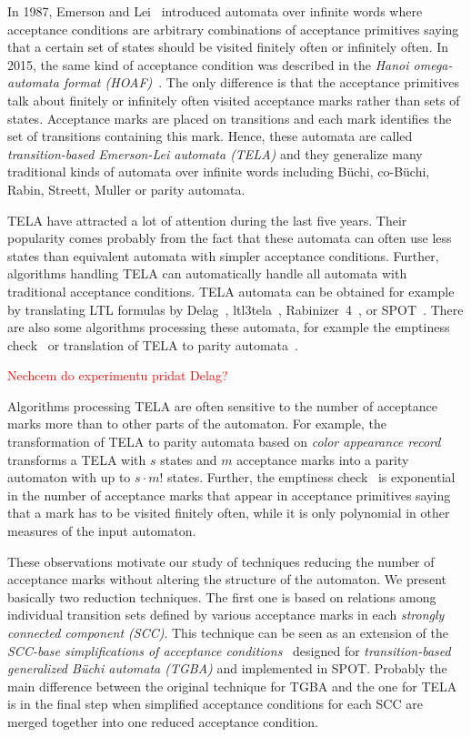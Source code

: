 \documentclass[a4paper,UKenglish,cleveref, autoref, anonymous, thm-restate]{lipics-v2021}
\newcommand{\todo}[1]{\textcolor{red}{#1}}
\begin{document}
In 1987, Emerson and Lei~\cite{emerson.87.scp} introduced automata
over infinite words where acceptance conditions are arbitrary
combinations of acceptance primitives saying that a certain set of
states should be visited finitely often or infinitely often. In 2015,
the same kind of acceptance condition was described in the \emph{Hanoi
  omega-automata format (HOAF)}~\cite{babiak.15.cav}. The only
difference is that the acceptance primitives talk about finitely or
infinitely often visited acceptance marks rather than sets of states.
Acceptance marks are placed on transitions and each mark identifies
the set of transitions containing this mark. Hence, these automata are
called \emph{transition-based Emerson-Lei automata (TELA)} and they
generalize many traditional kinds of automata over infinite words
including Büchi, co-Büchi, Rabin, Streett, Muller or parity
automata.

TELA have attracted a lot of attention during the last five years.
Their popularity comes probably from the fact that these automata can
often use less states than equivalent automata with simpler acceptance
conditions. Further, algorithms handling TELA can automatically handle
all automata with traditional acceptance conditions. TELA automata can
be obtained for example by translating LTL formulas by
Delag~\cite{muller.17.gandalf}, ltl3tela~\cite{major.19.atva},
Rabinizer~4~\cite{kretinsky.18.cav}, or
SPOT~\cite{duret.16.atva2}. There are also some algorithms processing
these automata, for example the emptiness check~\cite{baier.19.atva}
or translation of TELA to parity automata~\cite{renkin.20.atva}.

\todo{Nechcem do experimentu pridat Delag?}

Algorithms processing TELA are often sensitive to the number of
acceptance marks more than to other parts of the automaton. For
example, the transformation of TELA to parity automata based on
\emph{color appearance record}~\cite{renkin.20.atva} transforms a TELA
with $s$ states and $m$ acceptance marks into a parity automaton with
up to $s\cdot m!$ states. Further, the emptiness
check~\cite{baier.19.atva} is exponential in the number of acceptance
marks that appear in acceptance primitives saying that a mark has to
be visited finitely often, while it is only polynomial in other
measures of the input automaton.

These observations motivate our study of techniques reducing the
number of acceptance marks without altering the structure of the
automaton. We present basically two reduction techniques. The first
one is based on relations among individual transition sets defined by
various acceptance marks in each \emph{strongly connected component
  (SCC)}. This technique can be seen as an extension of the
\emph{SCC-base simplifications of acceptance
  conditions}~\cite{babiak.13.spin} designed for
\emph{transition-based generalized Büchi automata (TGBA)} and
implemented in SPOT. Probably the main difference between the original
technique for TGBA and the one for TELA is in the final step when
simplified acceptance conditions for each SCC are merged together into
one reduced acceptance condition.
\end{document}
